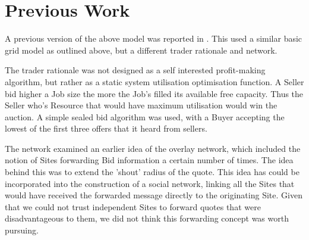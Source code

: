 

 

\section{Previous Work}

A previous version of the above model was reported in \cite{davy03-ukpew}.
This used a similar basic grid model as outlined above, but a different trader
rationale and network. 

The trader rationale was not designed as a self interested profit-making
algorithm, but rather as a static system utilisation optimisation function. A
Seller bid higher a Job size the more the Job's filled its available free
capacity. Thus the Seller who's Resource that would have maximum utilisation
would win the auction. A simple sealed bid algorithm was used, with a Buyer
accepting the lowest of the first three offers that it heard from sellers.

The network examined an earlier idea of the overlay network, which included the
notion of Sites forwarding Bid information a certain number of times. The idea
behind this was to extend the 'shout' radius of the quote. This idea has could
be incorporated into the construction of a social network, linking all the
Sites that would have received the forwarded message directly to the
originating Site. Given that we could not trust independent Sites to forward
quotes that were disadvantageous to them, we did not think this forwarding
concept was worth pursuing.

